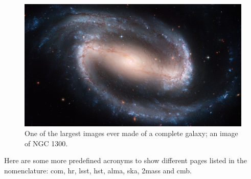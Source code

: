 \lipsum[5-8]
\begin{figure}[b!]
	\centering
	\includegraphics[width=\textwidth]{figures/NGC1300.png}
	\caption[An image of NGC 1300.]{One of the largest  images ever made of a complete galaxy; an image of NGC 1300.}
	\label{fig:NGC1300}
\end{figure}
\lipsum[9-16]

Here are some more predefined acronyms to show different pages listed in the nomenclature: \gls{com}, \gls{hr}, \gls{lsst}, \gls{hst}, \gls{alma}, \gls{ska}, \gls{2mass} and \gls{cmb}.
